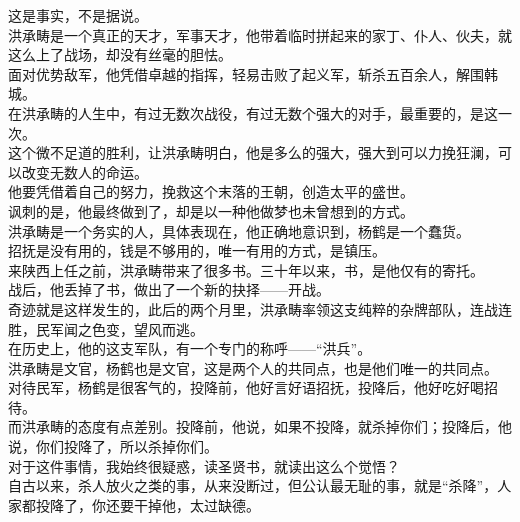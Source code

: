 \begin{multicols}{\theparacolNo}
这是事实，不是据说。\\

洪承畴是一个真正的天才，军事天才，他带着临时拼起来的家丁、仆人、伙夫，就这么上了战场，却没有丝毫的胆怯。\\

面对优势敌军，他凭借卓越的指挥，轻易击败了起义军，斩杀五百余人，解围韩城。\\

在洪承畴的人生中，有过无数次战役，有过无数个强大的对手，最重要的，是这一次。\\

这个微不足道的胜利，让洪承畴明白，他是多么的强大，强大到可以力挽狂澜，可以改变无数人的命运。\\

他要凭借着自己的努力，挽救这个末落的王朝，创造太平的盛世。\\

讽刺的是，他最终做到了，却是以一种他做梦也未曾想到的方式。\\

洪承畴是一个务实的人，具体表现在，他正确地意识到，杨鹤是一个蠢货。\\

招抚是没有用的，钱是不够用的，唯一有用的方式，是镇压。\\

来陕西上任之前，洪承畴带来了很多书。三十年以来，书，是他仅有的寄托。\\

战后，他丢掉了书，做出了一个新的抉择——开战。\\

奇迹就是这样发生的，此后的两个月里，洪承畴率领这支纯粹的杂牌部队，连战连胜，民军闻之色变，望风而逃。\\

在历史上，他的这支军队，有一个专门的称呼——“洪兵”。\\

洪承畴是文官，杨鹤也是文官，这是两个人的共同点，也是他们唯一的共同点。\\

对待民军，杨鹤是很客气的，投降前，他好言好语招抚，投降后，他好吃好喝招待。\\

而洪承畴的态度有点差别。投降前，他说，如果不投降，就杀掉你们；投降后，他说，你们投降了，所以杀掉你们。\\

对于这件事情，我始终很疑惑，读圣贤书，就读出这么个觉悟？\\

自古以来，杀人放火之类的事，从来没断过，但公认最无耻的事，就是“杀降”，人家都投降了，你还要干掉他，太过缺德。\\


\end{multicols}

